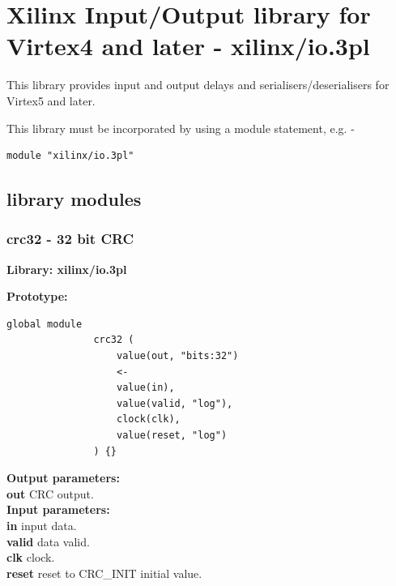 \pagebreak

\section{Xilinx Input/Output library for Virtex4 and later - xilinx/io.3pl}

    This library provides input and output delays and serialisers/deserialisers
    for Virtex5 and later.
    
    This library must be incorporated by using a module statement, e.g. -
    \begin{lstlisting}[gobble=4, language=threepl]
       module "xilinx/io.3pl"
    \end{lstlisting}


    \subsection{library modules}
    

        \subsubsection{crc32 - 32 bit CRC}\label{sec:lmcrc32}

            {\bf Library: xilinx/io.3pl}

            {\bf Prototype:} \\
            \vsp
            \begin{lstlisting}[gobble=12, language=threepl]
               global module
               crc32 (
                   value(out, "bits:32")
                   <-
                   value(in),
                   value(valid, "log"),
                   clock(clk),
                   value(reset, "log")
               ) {}
            \end{lstlisting}

            {\bf Output parameters:} \\
            {\bf out} CRC output.\\


            {\bf Input parameters:} \\
            {\bf in} input data.\\
            {\bf valid} data valid.\\
            {\bf clk} clock.\\
            {\bf reset} reset to CRC\_INIT initial value.\\


